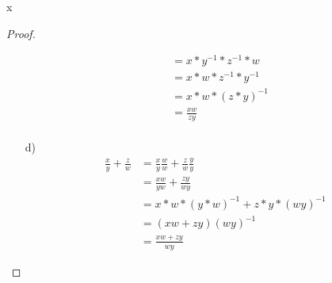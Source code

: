 \documentclass{problemset}
\begin{document}
\begin{problem}{x}
\begin{proof}
\begin{enumerate}
\begin{align*}
                                                  & = x*y^{-1} * z^{-1} * w               \\
                                                  & = x * w * z^{-1} * y^{-1}             \\
                                                  & = x * w * {(z * y)}^{-1}              \\
                                                  & = \frac{xw}{zy}                       \\
              \end{align*}
        \item [d)]
              \begin{align*}
                  \frac{x}{y} + \frac{z}{w} & = \frac{x}{y}\frac{w}{w} + \frac{z}{w}\frac{y}{y} \\
                                            & = \frac{xw}{yw} + \frac{zy}{wy}                   \\
                                            & = x*w * {(y*w)}^{-1} + z*y*{(wy)}^{-1}            \\
                                            & = (xw + zy){(wy)}^{-1}                            \\
                                            & = \frac{xw+zy}{wy}
              \end{align*}
    \end{enumerate}
\end{proof}
\end{problem}
\end{document}
